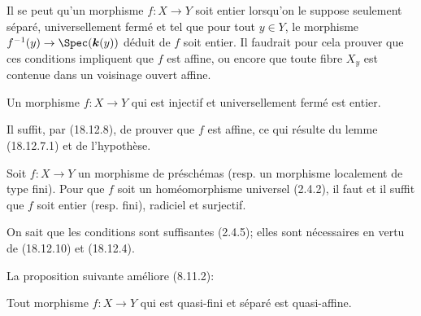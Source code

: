 \begin{remark}[18.12.9]
\label{IV.18.12.9}
Il se peut qu'un morphisme $f:X\to Y$ soit entier lorsqu'on le suppose seulement séparé, universellement fermé et tel que pour tout $y\in Y$, le morphisme $f^{-1}(y)\to\Spec(\boldsymbol{k}(y))$ déduit de $f$ soit entier. Il faudrait pour cela prouver que ces conditions impliquent que $f$ est affine, ou encore que toute fibre $X_y$ est contenue dans un voisinage ouvert affine.
\end{remark}

\begin{corollary}[18.12.10]
\label{IV.18.12.10}
Un morphisme $f:X\to Y$ qui est injectif et universellement fermé est entier.
\end{corollary}

Il suffit, par (18.12.8), de prouver que $f$ est affine, ce qui résulte du lemme (18.12.7.1) et de l'hypothèse.

\begin{corollary}[18.12.11]
\label{IV.18.12.11}
Soit $f:X\to Y$ un morphisme de préschémas \textup{(resp.} un morphisme localement de type fini\textup{)}. Pour que $f$ soit un homéomorphisme universel \textup{(2.4.2)}, il faut et il suffit que $f$ soit entier \textup{(resp.} fini\textup{)}, radiciel et surjectif.
\end{corollary}

On sait que les conditions sont suffisantes (2.4.5); elles sont nécessaires en vertu de (18.12.10) et (18.12.4).

La proposition suivante améliore (8.11.2):

\begin{proposition}[18.12.12]
\label{IV.18.12.12}
Tout morphisme $f:X\to Y$ qui est quasi-fini et séparé est quasi-affine.
\end{proposition}

